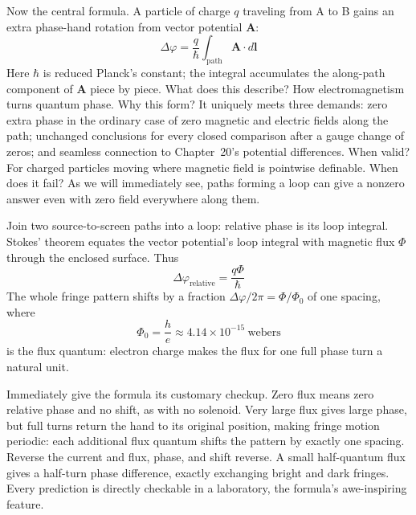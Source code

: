 \begin{center}
\end{center}

\begin{mainline}
Now the central formula. A particle of charge \(q\) traveling from A to B gains an extra phase-hand rotation from vector potential \(\mathbf A\):
\[
\Delta\varphi=\frac{q}{\hbar}\int_{\text{path}}\mathbf A\cdot d\mathbf l
\]
Here \(\hbar\) is reduced Planck's constant; the integral accumulates the along-path component of \(\mathbf A\) piece by piece. What does this describe? How electromagnetism turns quantum phase. Why this form? It uniquely meets three demands: zero extra phase in the ordinary case of zero magnetic and electric fields along the path; unchanged conclusions for every closed comparison after a gauge change of zeros; and seamless connection to Chapter~20's potential differences. When valid? For charged particles moving where magnetic field is pointwise definable. When does it fail? As we will immediately see, paths forming a loop can give a nonzero answer even with zero field everywhere along them.

Join two source-to-screen paths into a loop: relative phase is its loop integral. Stokes' theorem equates the vector potential's loop integral with magnetic flux \(\Phi\) through the enclosed surface. Thus
\[
\Delta\varphi_{\text{relative}}=\frac{q\Phi}{\hbar}
\]
The whole fringe pattern shifts by a fraction \(\Delta\varphi/2\pi=\Phi/\Phi_0\) of one spacing, where
\[
\Phi_0=\frac{h}{e}\approx4.14\times10^{-15}\ \text{webers}
\]
is the flux quantum: electron charge makes the flux for one full phase turn a natural unit.

Immediately give the formula its customary checkup. Zero flux means zero relative phase and no shift, as with no solenoid. Very large flux gives large phase, but full turns return the hand to its original position, making fringe motion periodic: each additional flux quantum shifts the pattern by exactly one spacing. Reverse the current and flux, phase, and shift reverse. A small half-quantum flux gives a half-turn phase difference, exactly exchanging bright and dark fringes. Every prediction is directly checkable in a laboratory, the formula's awe-inspiring feature.
\end{mainline}

